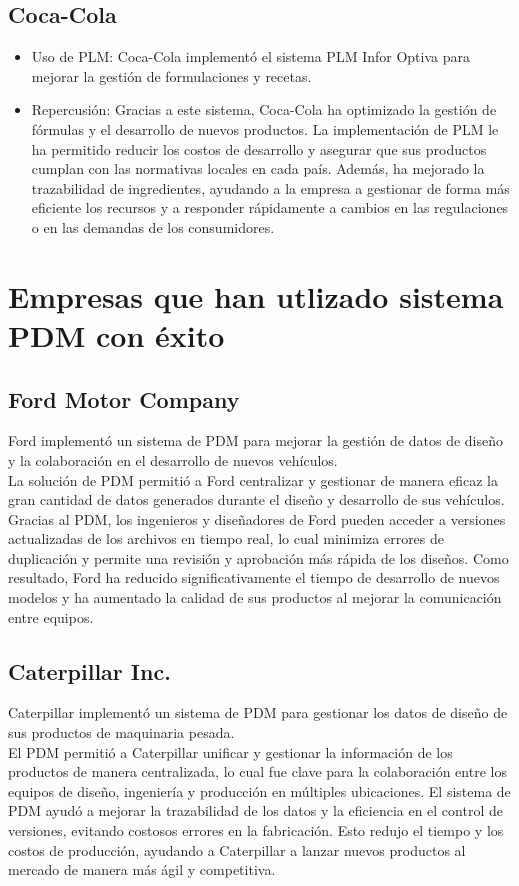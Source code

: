 \documentclass[12pt]{article}
\begin{document}
\subsection{Coca-Cola}
\begin{itemize}
    \item Uso de PLM: Coca-Cola implementó el sistema PLM Infor Optiva para mejorar la gestión de formulaciones y recetas.
    \item Repercusión: Gracias a este sistema, Coca-Cola ha optimizado la gestión de fórmulas y el desarrollo de nuevos productos. 
    La implementación de PLM le ha permitido reducir los costos de desarrollo y asegurar que sus productos cumplan con las normativas 
    locales en cada país. Además, ha mejorado la trazabilidad de ingredientes, ayudando a la empresa a gestionar de forma más eficiente 
    los recursos y a responder rápidamente a cambios en las regulaciones o en las demandas de los consumidores.
\end{itemize}

\section{Empresas que han utlizado sistema PDM con éxito}

\subsection{Ford Motor Company}
Ford implementó un sistema de PDM para mejorar la gestión de datos de diseño y la colaboración en el desarrollo de nuevos vehículos.
\\
La solución de PDM permitió a Ford centralizar y gestionar de manera eficaz la gran cantidad de datos generados durante el diseño y 
desarrollo de sus vehículos. Gracias al PDM, los ingenieros y diseñadores de Ford pueden acceder a versiones actualizadas de los archivos 
en tiempo real, lo cual minimiza errores de duplicación y permite una revisión y aprobación más rápida de los diseños. Como resultado, 
Ford ha reducido significativamente el tiempo de desarrollo de nuevos modelos y ha aumentado la calidad de sus productos al mejorar la 
comunicación entre equipos.

\subsection{Caterpillar Inc.}
Caterpillar implementó un sistema de PDM para gestionar los datos de diseño de sus productos de maquinaria pesada.
\\
El PDM permitió a Caterpillar unificar y gestionar la información de los productos de manera centralizada, lo cual fue clave para la 
colaboración entre los equipos de diseño, ingeniería y producción en múltiples ubicaciones. El sistema de PDM ayudó a mejorar la trazabilidad 
de los datos y la eficiencia en el control de versiones, evitando costosos errores en la fabricación. Esto redujo el tiempo y los costos de 
producción, ayudando a Caterpillar a lanzar nuevos productos al mercado de manera más ágil y competitiva.
\end{document}
